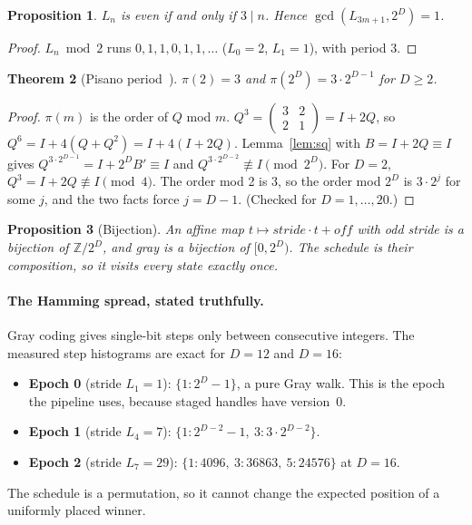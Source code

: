 \documentclass[11pt]{article}
\newtheorem{theorem}{Theorem}[section]
\newtheorem{proposition}[theorem]{Proposition}
\theoremstyle{definition}
\newcommand{\Z}{\mathbb{Z}}
\begin{document}
\begin{proposition}
$L_n$ is even if and only if $3\mid n$. Hence $\gcd(L_{3m+1},2^D)=1$.
\end{proposition}
\begin{proof}
$L_n\bmod 2$ runs $0,1,1,0,1,1,\dots$ ($L_0=2$, $L_1=1$), with period 3.
\end{proof}

\begin{theorem}[Pisano period~\cite{wall}]\label{thm:pisano}
$\pi(2)=3$ and $\pi(2^D)=3\cdot2^{D-1}$ for $D\ge2$.
\end{theorem}
\begin{proof}
$\pi(m)$ is the order of $Q$ mod $m$. $Q^3=\begin{pmatrix}3&2\\2&1\end{pmatrix}=I+2Q$, so
$Q^6=I+4(Q+Q^2)=I+4(I+2Q)$. Lemma~\ref{lem:sq} with $B=I+2Q\equiv I$ gives $Q^{3\cdot2^{D-1}}=I+2^DB'\equiv I$ and
$Q^{3\cdot2^{D-2}}\not\equiv I\pmod{2^D}$. For $D=2$, $Q^3=I+2Q\not\equiv I\pmod4$. The order mod 2 is 3, so the
order mod $2^D$ is $3\cdot2^j$ for some $j$, and the two facts force $j=D-1$. (Checked for $D=1,\dots,20$.)
\end{proof}

\begin{proposition}[Bijection]
An affine map $t\mapsto\mathit{stride}\cdot t+\mathit{off}$ with odd stride is a bijection of $\Z/2^D$, and gray is a
bijection of $[0,2^D)$. The schedule is their composition, so it visits every state exactly once.
\end{proposition}

\paragraph{The Hamming spread, stated truthfully.}
Gray coding gives single-bit steps only between consecutive integers. The measured step histograms are exact for
$D=12$ and $D=16$:
\begin{itemize}
\item \textbf{Epoch 0} (stride $L_1=1$): $\{1:2^D-1\}$, a pure Gray walk. This is the epoch the pipeline uses,
because staged handles have version~0.
\item \textbf{Epoch 1} (stride $L_4=7$): $\{1:2^{D-2}-1,\ 3:3\cdot2^{D-2}\}$.
\item \textbf{Epoch 2} (stride $L_7=29$): $\{1:4096,\ 3:36863,\ 5:24576\}$ at $D=16$.
\end{itemize}
The schedule is a permutation, so it cannot change the expected position of a uniformly placed winner.
\end{document}
